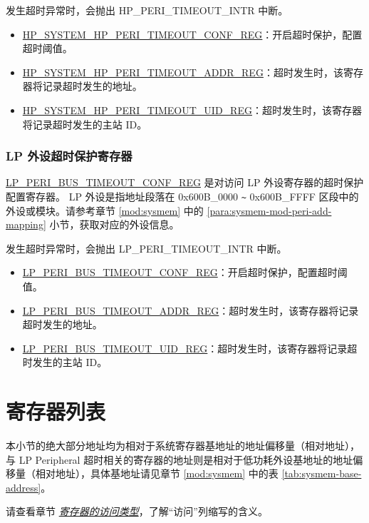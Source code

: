 \documentclass[main\_\_CN.tex]{subfiles}
\begin{document}
发生超时异常时，会抛出 HP\_PERI\_TIMEOUT\_INTR 中断。

\begin{itemize}
    \item \hyperref[regdesc:HPSYSTEMHPPERITIMEOUTCONFREG]{HP\_SYSTEM\_HP\_PERI\_TIMEOUT\_CONF\_REG}：开启超时保护，配置超时阈值。
    \item \hyperref[regdesc:HPSYSTEMHPPERITIMEOUTADDRREG]{HP\_SYSTEM\_HP\_PERI\_TIMEOUT\_ADDR\_REG}：超时发生时，该寄存器将记录超时发生的地址。
    \item \hyperref[regdesc:HPSYSTEMHPPERITIMEOUTUIDREG]{HP\_SYSTEM\_HP\_PERI\_TIMEOUT\_UID\_REG}：超时发生时，该寄存器将记录超时发生的主站 ID。
\end{itemize}


\subsubsection{LP 外设超时保护寄存器}

\hyperref[regdesc:LPPERIBUSTIMEOUTCONFREG]{LP\_PERI\_BUS\_TIMEOUT\_CONF\_REG} 是对访问 LP 外设寄存器的超时保护配置寄存器。
LP 外设是指地址段落在 0x600B\_0000 \verb+~+ 0x600B\_FFFF 区段中的外设或模块。请参考章节 \ref{mod:sysmem} \textit{} 中的 \ref{para:sysmem-mod-peri-add-mapping} \textit{} 小节，获取对应的外设信息。

发生超时异常时，会抛出 LP\_PERI\_TIMEOUT\_INTR 中断。

\begin{itemize}
    \item \hyperref[regdesc:LPPERIBUSTIMEOUTCONFREG]{LP\_PERI\_BUS\_TIMEOUT\_CONF\_REG}：开启超时保护，配置超时阈值。
    \item \hyperref[regdesc:LPPERIBUSTIMEOUTADDRREG]{LP\_PERI\_BUS\_TIMEOUT\_ADDR\_REG}：超时发生时，该寄存器将记录超时发生的地址。
    \item \hyperref[regdesc:LPPERIBUSTIMEOUTUIDREG]{LP\_PERI\_BUS\_TIMEOUT\_UID\_REG}：超时发生时，该寄存器将记录超时发生的主站 ID。
\end{itemize}



\clearpage
\begin{landscape}
\hypertarget{sysreg-reg-summ}{}
\section{寄存器列表}
\label{sec:sysreg-reg-summ}

本小节的绝大部分地址均为相对于系统寄存器基地址的地址偏移量（相对地址），与 LP Peripheral 超时相关的寄存器的地址则是相对于低功耗外设基地址的地址偏移量（相对地址），具体基地址请见章节 \ref{mod:sysmem} \textit{} 中的表 \ref{tab:sysmem-base-address}。

请查看章节 \hyperref[glossary-access-types]{\textit{寄存器的访问类型}}，了解“访问”列缩写的含义。


\end{landscape}
\end{document}
